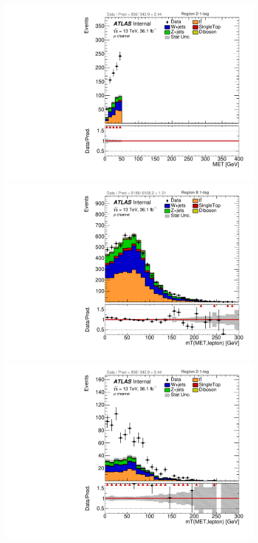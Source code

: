 \begin{figure}[!htbp]
\begin{center}
\includegraphics[scale=0.33]{./figures/boosted/ABCD_1tag0bjet/muon_Inc_RegionD_MET}   \\
\includegraphics[scale=0.33]{./figures/boosted/ABCD_1tag0bjet/muon_Inc_RegionB_WlepMtATLAS}
\includegraphics[scale=0.33]{./figures/boosted/ABCD_1tag0bjet/muon_Inc_RegionD_WlepMtATLAS}\\

\end{center}
\end{figure}
